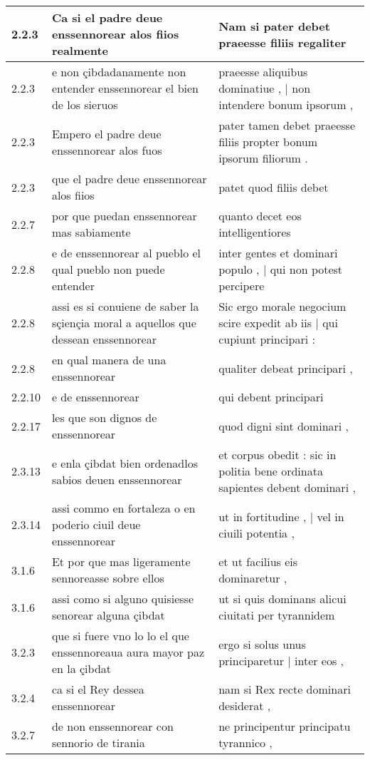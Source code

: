 \begin{tabular}{|p{1cm}|p{6.5cm}|p{6.5cm}|}
2.2.3 & Ca si el padre deue enssennorear alos fiios realmente & Nam si pater debet praeesse filiis regaliter \\\hline
2.2.3 & e non çibdadanamente non entender enssennorear el bien de los sieruos & praeesse aliquibus dominatiue , | non intendere bonum ipsorum , \\\hline
2.2.3 & Empero el padre deue enssennorear alos fuos & pater tamen debet praeesse filiis propter bonum ipsorum filiorum . \\\hline
2.2.3 & que el padre deue enssennorear alos fiios & patet quod filiis debet \\\hline
2.2.7 & por que puedan enssennorear mas sabiamente & quanto decet eos intelligentiores \\\hline
2.2.8 & e de enssennorear al pueblo el qual pueblo non puede entender & inter gentes et dominari populo , | qui non potest percipere \\\hline
2.2.8 & assi es si conuiene de saber la sçiençia moral a aquellos que dessean enssennorear & Sic ergo morale negocium scire expedit ab iis | qui cupiunt principari : \\\hline
2.2.8 & en qual manera de una enssennorear & qualiter debeat principari , \\\hline
2.2.10 & e de enssennorear & qui debent principari \\\hline
2.2.17 & les que son dignos de enssennorear & quod digni sint dominari , \\\hline
2.3.13 & e enla çibdat bien ordenadlos sabios deuen enssennorear & et corpus obedit : sic in politia bene ordinata sapientes debent dominari , \\\hline
2.3.14 & assi commo en fortaleza o en poderio ciuil deue enssennorear & ut in fortitudine , | vel in ciuili potentia , \\\hline
3.1.6 & Et por que mas ligeramente sennoreasse sobre ellos & et ut facilius eis dominaretur , \\\hline
3.1.6 & assi como si alguno quisiesse senorear alguna çibdat & ut si quis dominans alicui ciuitati per tyrannidem \\\hline
3.2.3 & que si fuere vno lo lo el que enssennoreaua aura mayor paz en la çibdat & ergo si solus unus principaretur | inter eos , \\\hline
3.2.4 & ca si el Rey dessea enssennorear & nam si Rex recte dominari desiderat , \\\hline
3.2.7 & de non enssennorear con sennorio de tirania & ne principentur principatu tyrannico , \\\hline

\end{tabular}
